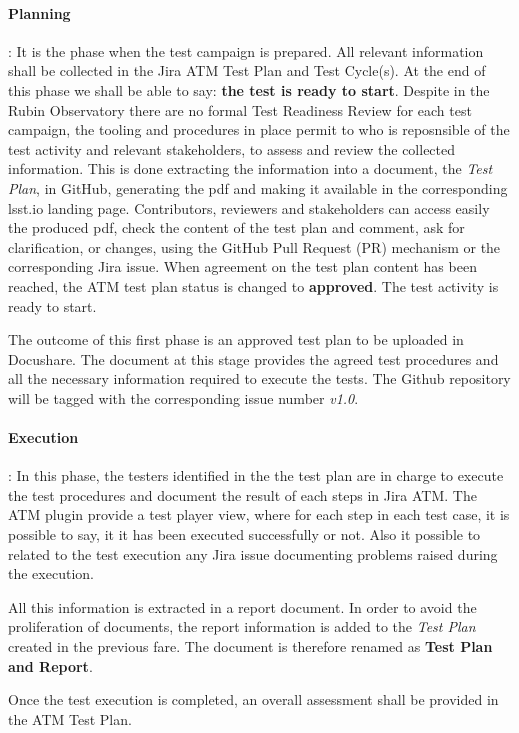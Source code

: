 \paragraph{Planning}:
It is the phase when the test campaign is prepared. All relevant information shall be collected in the Jira ATM Test Plan and 
Test Cycle(s). 
At the end of this phase we shall be able to say: \textbf{the test is ready to start}.
Despite in the Rubin Observatory there are no formal Test Readiness Review for each test campaign, 
the tooling and procedures in place permit to who is reposnsible of the test activity and relevant stakeholders, to assess and review the collected information. 
This is done extracting the information into a document, the \textit{Test Plan}, in GitHub, generating the pdf and making it available
in the corresponding lsst.io landing page. Contributors, reviewers and stakeholders can access easily the produced pdf,
check the content of the test plan and comment, ask for clarification, or changes, using the GitHub
Pull Request (PR) mechanism or the corresponding Jira issue.
When agreement on the test plan content has been reached, the ATM test plan status is changed to \textbf{approved}. The test activity is ready to start.

The outcome of this first phase is an approved test plan to be uploaded in Docushare. 
The document at this stage provides the agreed test procedures and all the necessary information required to execute the tests.
The Github repository will be tagged with the corresponding issue number \textit{v1.0}.

\paragraph{Execution}:
In this phase, the testers identified in the the test plan are in charge to execute the test procedures and 
document the result of each steps in Jira ATM.
The ATM plugin provide a test player view, where for each step in each test case, it is possible to say, it it has been executed successfully or not.
Also it possible to related to the test execution any Jira issue documenting problems raised during the execution.

All this information is extracted in a report document.
In order to avoid the proliferation of documents, the  report information is added to the \textit{Test Plan} created in the previous fare.
The document is therefore renamed as \textbf{Test Plan and Report}.

Once the test execution is completed, an overall assessment shall be provided in the ATM Test Plan.


